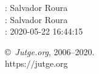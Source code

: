 \documentclass[11pt]{article}
\begin{document}
    \newcommand{\SampleTwoCol}{\SampleTwoColInputOutput{sample-1}{1}\SampleTwoColInputOutput{sample-2}{2}}
    \newcommand{\SampleOneCol}{\SampleOneColInputOutput{sample-1}{1}\SampleOneColInputOutput{sample-2}{2}}

    \ProblemInformation
    \Author: Salvador Roura\\    \Translator: Salvador Roura\\
    \Generation: 2020-05-22 16:44:15

    \bigskip

    \copyright\ \emph{Jutge.org}, 2006--2020. \\
    https:$/\!\!/$jutge.org
\end{document}

